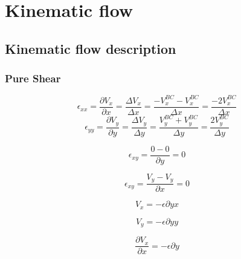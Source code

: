 \documentclass{article}
\begin{document}
    \section{Kinematic flow}

    \subsection{Kinematic flow description}
    \subsubsection{Pure Shear}

    \begin{equation}
    {\epsilon_{xx} = \frac{\partial V_x}{\partial x} = \frac{\Delta V_x}{\Delta x}
        = \frac{-V_{x}^{BC} - V_{x}^{BC}}{\Delta x} =\frac{ -2V_{x}^{BC}}{\Delta x}}
    \end{equation}
    \begin{equation}
        \epsilon_{yy} = \frac{\partial V_y}{\partial y} = \frac{\Delta V_y}{\Delta y}
        = \frac{V_{y}^{BC} + V_{y}^{BC}}{\Delta y} =\frac{ 2V_{y}^{BC}}{\Delta y}
    \end{equation}
    \begin{minipage}{0.4\textwidth}
        \begin{equation}
            \epsilon_{xy} = \frac{0 - 0}{\partial y} = 0
        \end{equation}
    \end{minipage}
    \begin{minipage}{0.4\textwidth}
        \begin{equation}
            \epsilon_{xy} = \frac{V_{y} - V_{y}}{\partial x} = 0
        \end{equation}
    \end{minipage}

    \begin{minipage}{0.4\textwidth}
        \begin{equation}
            V_{x} = -\epsilon \partial yx
        \end{equation}
    \end{minipage}
    \begin{minipage}{0.4\textwidth}
        \begin{equation}
            V_{y} = -\epsilon \partial yy
        \end{equation}
    \end{minipage}

    \begin{minipage}{0.4\textwidth}
        \begin{equation}
            \frac{\partial V_x}{\partial x} = -\epsilon \partial y
        \end{equation}
    \end{minipage}
\end{document}
